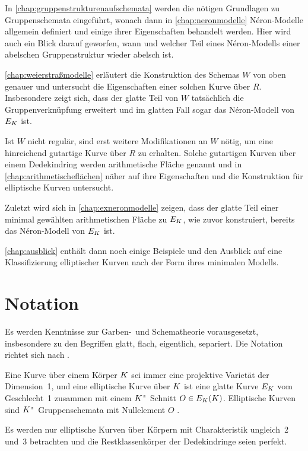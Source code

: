 In \autoref{chap:gruppenstrukturenaufschemata} werden die nötigen
Grundlagen zu Gruppenschemata eingeführt, wonach dann in
\autoref{chap:neronmodelle} Néron-Modelle allgemein definiert und
einige ihrer Eigenschaften behandelt werden.
Hier wird auch ein Blick darauf geworfen, wann und welcher Teil eines
Néron-Modells einer abelschen Gruppenstruktur wieder abelsch ist.

\autoref{chap:weierstraßmodelle} erläutert die Konstruktion des
Schemas $W$ von oben genauer und untersucht die Eigenschaften einer
solchen Kurve über $R$. Insbesondere zeigt sich, dass der glatte
Teil von $W$ tatsächlich die Gruppenverknüpfung erweitert 
und im glatten Fall sogar das Néron-Modell von $E_{K}$ ist.

Ist $W$ nicht regulär, sind erst weitere Modifikationen an $W$
nötig, um eine hinreichend gutartige Kurve über $R$ zu
erhalten. Solche gutartigen Kurven über einem Dedekindring werden
arithmetische Fläche genannt und in
\autoref{chap:arithmetischeflächen} näher auf ihre Eigenschaften und
die Konstruktion für elliptische Kurven untersucht.

Zuletzt wird sich in \autoref{chap:exneronmodelle} zeigen, dass der
glatte Teil einer minimal gewählten arithmetischen Fläche zu $E_{K}$,
wie zuvor konstruiert, bereits das Néron-Modell von $E_{K}$ ist.

\autoref{chap:ausblick} enthält dann noch einige Beispiele und den
Ausblick auf eine Klassifizierung elliptischer Kurven nach der Form
ihres minimalen Modells.

\section*{Notation}
Es werden Kenntnisse zur Garben-~und Schematheorie vorausgesetzt,
insbesondere zu den Begriffen glatt, flach, eigentlich, separiert.
Die Notation richtet sich nach \cite{wedhorn}.

Eine Kurve über einem Körper $K$ sei immer eine projektive Varietät
der Dimension~1,
und eine elliptische Kurve über $K$ ist eine glatte Kurve $E_{K}$
vom Geschlecht~1 zusammen mit einem $K$"~Schnitt $O\in E_{K}(K)$.
Elliptische Kurven sind $K$"~Gruppenschemata mit Nullelement $O$
\cite{silverman}.

Es werden nur elliptische Kurven über Körpern mit Charakteristik
ungleich~2 und~3 betrachten und die Restklassenkörper der
Dedekindringe seien perfekt.

